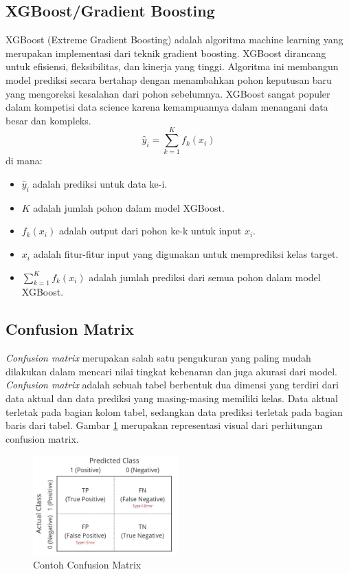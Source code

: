 \subsection{XGBoost/Gradient Boosting}
XGBoost (Extreme Gradient Boosting) adalah algoritma machine learning yang merupakan implementasi dari teknik gradient boosting. XGBoost dirancang untuk efisiensi, fleksibilitas, dan kinerja yang tinggi. Algoritma ini membangun model prediksi secara bertahap dengan menambahkan pohon keputusan baru yang mengoreksi kesalahan dari pohon sebelumnya. XGBoost sangat populer dalam kompetisi data science karena kemampuannya dalam menangani data besar dan kompleks.
\begin{equation}
    \hat{y}_i = \sum_{k=1}^{K} f_k(x_i)
\end{equation}
di mana:
\begin{itemize}
    \item \( \hat{y}_i \) adalah prediksi untuk data ke-i.
    \item \( K \) adalah jumlah pohon dalam model XGBoost.
    \item \( f_k(x_i) \) adalah output dari pohon ke-k untuk input \( x_i \).
    \item \( x_i \) adalah fitur-fitur input yang digunakan untuk memprediksi kelas target.
    \item \( \sum_{k=1}^{K} f_k(x_i) \) adalah jumlah prediksi dari semua pohon dalam model XGBoost.
\end{itemize}

\subsection{Confusion Matrix}
\emph{Confusion matrix} merupakan salah satu pengukuran yang paling mudah dilakukan dalam mencari nilai tingkat kebenaran dan juga akurasi dari model. \emph{Confusion matrix} adalah sebuah tabel berbentuk dua dimensi yang terdiri dari data aktual dan data prediksi yang masing-masing memiliki kelas. Data aktual terletak pada bagian kolom tabel, sedangkan data prediksi terletak pada bagian baris dari tabel. Gambar \ref{fig:confusion_matrix} merupakan representasi visual dari perhitungan confusion matrix.

\begin{figure}[ht]
    \centering
    \includegraphics[width=0.5\textwidth]{gambar/conf.jpg}
    \caption{Contoh Confusion Matrix}
    \label{fig:confusion_matrix}
\end{figure}

